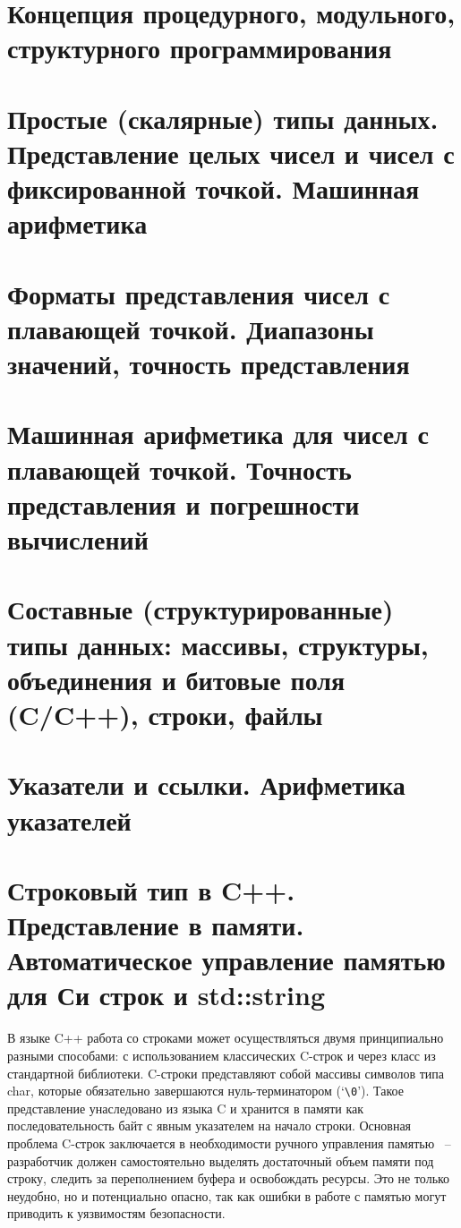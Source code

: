 \section{Концепция процедурного, модульного, структурного программирования}
\section{Простые (скалярные) типы данных. Представление целых чисел и чисел с фиксированной точкой. Машинная арифметика}
\section{Форматы представления чисел с плавающей точкой. Диапазоны значений, точность представления}
\section{Машинная арифметика для чисел с плавающей точкой. Точность представления и погрешности вычислений}
\section{Составные (структурированные) типы данных: массивы, структуры, объединения и битовые поля (C/C++), строки, файлы}
\section{Указатели и ссылки. Арифметика указателей}
\section{Строковый тип в C++. Представление в памяти. Автоматическое управление памятью для Си строк и std::string}
В языке C++ работа со строками может осуществляться двумя принципиально разными способами: с использованием классических C-строк и через класс  из 
стандартной библиотеки. C-строки представляют собой массивы символов типа char, которые обязательно завершаются нуль-терминатором (`\verb|\0|'). Такое представление унаследовано из 
языка C и хранится в памяти как последовательность байт с явным указателем на начало строки. Основная проблема C-строк заключается в необходимости ручного управления памятью
~-- разработчик должен самостоятельно выделять достаточный объем памяти под строку, следить за переполнением буфера и освобождать ресурсы. Это не только неудобно, но и 
потенциально опасно, так как ошибки в работе с памятью могут приводить к уязвимостям безопасности.

